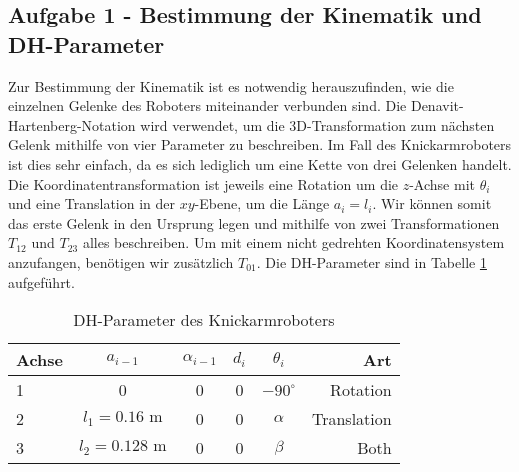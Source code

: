 \subsection*{Aufgabe 1 - Bestimmung der Kinematik und DH-Parameter}

Zur Bestimmung der Kinematik ist es notwendig herauszufinden, wie die einzelnen Gelenke des Roboters miteinander verbunden sind.
Die Denavit-Hartenberg-Notation wird verwendet, um die 3D-Transformation zum nächsten Gelenk mithilfe von vier Parameter zu beschreiben. Im Fall des Knickarmroboters ist
dies sehr einfach, da es sich lediglich um eine Kette von drei Gelenken handelt. Die Koordinatentransformation ist jeweils eine Rotation um die $z$-Achse mit $\theta_i$
und eine Translation in der $xy$-Ebene, um die Länge $a_i = l_i$. Wir können somit das erste Gelenk in den Ursprung legen und mithilfe von zwei Transformationen $T_{12}$ und $T_{23}$ alles beschreiben. Um mit einem nicht gedrehten Koordinatensystem anzufangen, benötigen wir zusätzlich $T_{01}$. Die DH-Parameter sind in Tabelle \ref{tab:DH} aufgeführt.



\begin{table}[tb]
	\centering
	\begin{tabular}{lccccr}
		\toprule
		Achse & $a_{i-1}$ & $\alpha_{i-1}$ & $d_i$ & $\theta_i$ & Art \\
		\midrule
		1 & 0& 0& 0& $-90^\circ $& Rotation \\
		2 & $l_1 = 0.16 \text{ m}$& 0& 0& $\alpha$& Translation\\
		3 & $l_2 = 0.128 \text{ m}$& 0& 0& $\beta$& Both\\ 
		\bottomrule
	\end{tabular}
	\caption{DH-Parameter des Knickarmroboters}
	\label{tab:DH}
\end{table}

